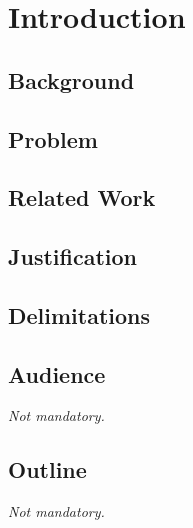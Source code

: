 \chapter{Introduction}

\lipsum[1]

\section{Background}

\lipsum[2-3]

\section{Problem}

\lipsum[4]

\section{Related Work}

\lipsum[5]

\section{Justification}

\lipsum[6]

\section{Delimitations}

\lipsum[7]

\section{Audience}

\emph{Not mandatory.}

\lipsum[8]

\section{Outline}

\emph{Not mandatory.}

\lipsum[9]